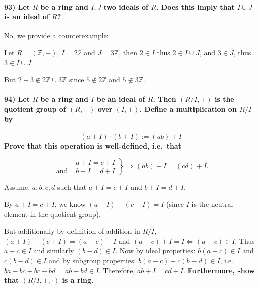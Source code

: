 \documentclass[
]{article}
\begin{document}
\hypertarget{let-r-be-a-ring-and-ij-two-ideals-of-r.-does-this-imply-that-i-cup-j-is-an-ideal-of-r}{%
\paragraph{\texorpdfstring{93) Let \(R\) be a ring and \(I,J\) two
ideals of \(R\). Does this imply that \(I \cup J\) is an ideal of
\(R\)?}{93) Let R be a ring and I,J two ideals of R. Does this imply that I \textbackslash cup J is an ideal of R?}}\label{let-r-be-a-ring-and-ij-two-ideals-of-r.-does-this-imply-that-i-cup-j-is-an-ideal-of-r}}

No, we provide a counterexample:

Let \(R = (\mathbb{Z}, +)\), \(I = 2 \mathbb{2}\) and
\(J = 3 \mathbb{Z}\), then \(2 \in I\) thus \(2 \in I \cup J\), and
\(3 \in J\), thus \(3 \in I \cup J\).

But \(2+3 \not \in 2\mathbb{Z} \cup 3\mathbb{Z}\) since
\(5 \not \in 2\mathbb{Z}\) and \(5 \not \in 3\mathbb{Z}\).

\hypertarget{let-r-be-a-ring-and-i-be-an-ideal-of-r.-then-r-i-is-the-quotient-group-of-r-over-i.-define-a-multiplication-on-ri-by}{%
\paragraph{\texorpdfstring{94) Let \(R\) be a ring and \(I\) be an ideal
of \(R\). Then \((R/ I,+)\) is the quotient group of \((R,+)\) over
\((I,+)\). Define a multiplication on \(R/I\)
by}{94) Let R be a ring and I be an ideal of R. Then (R/ I,+) is the quotient group of (R,+) over (I,+). Define a multiplication on R/I by}}\label{let-r-be-a-ring-and-i-be-an-ideal-of-r.-then-r-i-is-the-quotient-group-of-r-over-i.-define-a-multiplication-on-ri-by}}

\[
(a+I)\cdot (b+I) := (ab)+I
\] \textbf{Prove that this operation is well-defined, i.e.~that}

\[
\left.
  \begin{array}{lr}
    &a+I = c+I \\
    \text{and } &b+I  = d+I
  \end{array}
\right\} \Longrightarrow (ab) + I = (cd) +I.
\]

Assume, \(a,b,c,d\) such that \(a + I = c + I\) and \(b + I = d + I\).

By \(a + I = c + I\), we know \((a+I) - (c+I) = I\) (since \(I\) is the
neutral element in the quotient group).

But additionally by definition of addition in \(R/I\),
\((a+I) - (c+I) = (a-c) + I\) and
\((a-c) + I = I \Leftrightarrow (a-c) \in I\). Thus \(a-c \in I\) and
similarly \((b-d) \in I\). Now by ideal properties: \(b(a-c) \in I\) and
\(c(b-d) \in I\) and by subgroup properties: \(b(a-c) + c(b-d) \in I\),
i.e.~\(ba-bc+bc-bd = ab - bd \in I\). Therefore, \(ab + I = cd + I\).
\textbf{Furthermore, show that \((R/I,+,\cdot)\) is a ring.}
\end{document}
